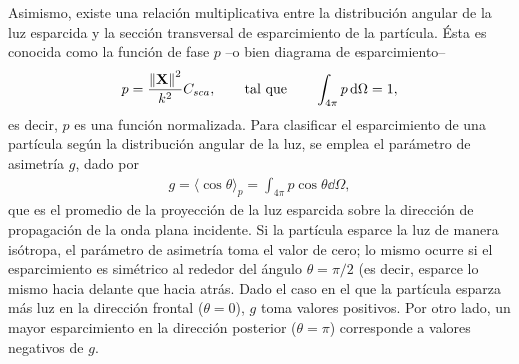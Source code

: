 Asimismo, existe una relación multiplicativa entre la distribución angular de la luz esparcida y la sección transversal de esparcimiento de la partícula. Ésta es conocida como la función de fase $p$ –o bien diagrama de esparcimiento– 
%
\begin{align}
p =  \frac{\norm{\vb{X}}^2}{k^2} C_{sca},\qquad\text{tal que}\qquad \int_{4\pi}p\dd{\Omega} = 1,
\end{align}
%
es decir, $p$ es una función normalizada. Para clasificar el esparcimiento de una partícula según la distribución angular de la luz, se emplea el parámetro de asimetría $g$, dado por
%
\begin{align}
g = \langle \cos\theta \rangle_p  = \int_{4\pi}p\cos\theta\dd{\Omega},
\end{align}
%
que es el promedio de la proyección de la luz esparcida sobre la dirección de propagación de la onda plana incidente. Si la partícula esparce la luz de manera isótropa, el parámetro de asimetría toma el valor de cero; lo mismo ocurre si el esparcimiento es simétrico al rededor del ángulo $\theta = \pi/2$ (es decir, esparce lo mismo hacia delante que hacia atrás. Dado el caso en el que la partícula esparza más luz en la dirección frontal ($\theta = 0$), $g$ toma valores positivos. Por otro lado, un mayor esparcimiento en la dirección posterior ($\theta = \pi$) corresponde a valores negativos de $g$.
	
